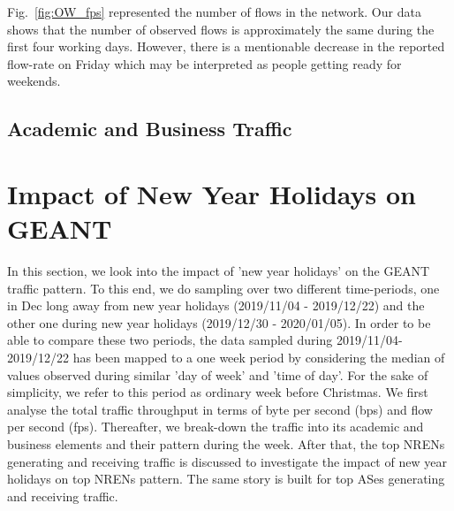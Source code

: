 \documentclass[10pt, journal, letterpaper]{IEEEtran}
\begin{document}
Fig.~\ref{fig:OW_fps} represented the number of flows in the network. Our data shows that the number of observed flows is approximately the same during the first four working days. However, there is a mentionable decrease in the reported flow-rate on Friday which may be interpreted as people getting ready for weekends.

\subsection{Academic and Business Traffic}

\section{Impact of New Year Holidays on GEANT}
In this section, we look into the impact of 'new year holidays' on the GEANT traffic pattern. To this end, we do sampling over two different time-periods, one in Dec long away from new year holidays (2019/11/04 - 2019/12/22) and the other one during new year holidays (2019/12/30 - 2020/01/05). In order to be able to compare these two periods, the data sampled during 2019/11/04-2019/12/22 has been mapped to a one week period by considering the median of values observed during similar 'day of week' and 'time of day'. For the sake of simplicity, we refer to this period as ordinary week before Christmas. We first analyse the total traffic throughput in terms of byte per second (bps) and flow per second (fps). Thereafter, we break-down the traffic into its academic and business elements and their pattern during the week. After that, the top NRENs generating and receiving traffic is discussed to investigate the impact of new year holidays on top NRENs pattern. The same story is built for top ASes generating and receiving traffic.
\end{document}
